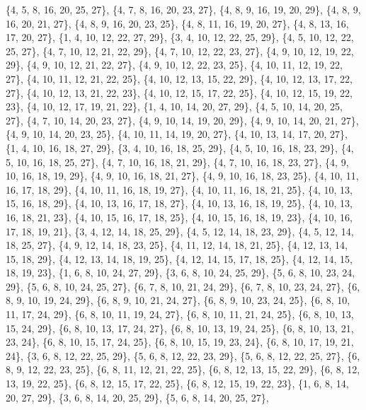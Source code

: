 \documentclass[11pt,a4paper]{article}
\begin{document}
{\{4, 5, 8, 16, 20, 25, 27\}, \{4, 7, 8, 16, 20, 23, 27\}, \{4, 8, 9, 16, 19, 20, 29\}, \{4, 8, 9, 16, 20, 21, 27\}, \{4, 8, 9, 16, 20, 23, 25\},
\{4, 8, 11, 16, 19, 20, 27\}, \{4, 8, 13, 16, 17, 20, 27\}, \{1, 4, 10, 12, 22, 27, 29\}, \{3, 4, 10, 12, 22, 25, 29\}, \{4, 5, 10, 12, 22, 25, 27\},
\{4, 7, 10, 12, 21, 22, 29\}, \{4, 7, 10, 12, 22, 23, 27\}, \{4, 9, 10, 12, 19, 22, 29\}, \{4, 9, 10, 12, 21, 22, 27\}, \{4, 9, 10, 12, 22, 23, 25\},
\{4, 10, 11, 12, 19, 22, 27\}, \{4, 10, 11, 12, 21, 22, 25\}, \{4, 10, 12, 13, 15, 22, 29\}, \{4, 10, 12, 13, 17, 22, 27\}, \{4, 10, 12, 13, 21, 22, 23\},
\{4, 10, 12, 15, 17, 22, 25\}, \{4, 10, 12, 15, 19, 22, 23\}, \{4, 10, 12, 17, 19, 21, 22\}, \{1, 4, 10, 14, 20, 27, 29\}, \{4, 5, 10, 14, 20, 25, 27\},
\{4, 7, 10, 14, 20, 23, 27\}, \{4, 9, 10, 14, 19, 20, 29\}, \{4, 9, 10, 14, 20, 21, 27\}, \{4, 9, 10, 14, 20, 23, 25\}, \{4, 10, 11, 14, 19, 20, 27\},
\{4, 10, 13, 14, 17, 20, 27\}, \{1, 4, 10, 16, 18, 27, 29\}, \{3, 4, 10, 16, 18, 25, 29\}, \{4, 5, 10, 16, 18, 23, 29\}, \{4, 5, 10, 16, 18, 25, 27\},
\{4, 7, 10, 16, 18, 21, 29\}, \{4, 7, 10, 16, 18, 23, 27\}, \{4, 9, 10, 16, 18, 19, 29\}, \{4, 9, 10, 16, 18, 21, 27\}, \{4, 9, 10, 16, 18, 23, 25\},
\{4, 10, 11, 16, 17, 18, 29\}, \{4, 10, 11, 16, 18, 19, 27\}, \{4, 10, 11, 16, 18, 21, 25\}, \{4, 10, 13, 15, 16, 18, 29\}, \{4, 10, 13, 16, 17, 18, 27\},
\{4, 10, 13, 16, 18, 19, 25\}, \{4, 10, 13, 16, 18, 21, 23\}, \{4, 10, 15, 16, 17, 18, 25\}, \{4, 10, 15, 16, 18, 19, 23\}, \{4, 10, 16, 17, 18, 19, 21\},
\{3, 4, 12, 14, 18, 25, 29\}, \{4, 5, 12, 14, 18, 23, 29\}, \{4, 5, 12, 14, 18, 25, 27\}, \{4, 9, 12, 14, 18, 23, 25\}, \{4, 11, 12, 14, 18, 21, 25\},
\{4, 12, 13, 14, 15, 18, 29\}, \{4, 12, 13, 14, 18, 19, 25\}, \{4, 12, 14, 15, 17, 18, 25\}, \{4, 12, 14, 15, 18, 19, 23\}, \{1, 6, 8, 10, 24, 27, 29\},
\{3, 6, 8, 10, 24, 25, 29\}, \{5, 6, 8, 10, 23, 24, 29\}, \{5, 6, 8, 10, 24, 25, 27\}, \{6, 7, 8, 10, 21, 24, 29\}, \{6, 7, 8, 10, 23, 24, 27\},
\{6, 8, 9, 10, 19, 24, 29\}, \{6, 8, 9, 10, 21, 24, 27\}, \{6, 8, 9, 10, 23, 24, 25\}, \{6, 8, 10, 11, 17, 24, 29\}, \{6, 8, 10, 11, 19, 24, 27\},
\{6, 8, 10, 11, 21, 24, 25\}, \{6, 8, 10, 13, 15, 24, 29\}, \{6, 8, 10, 13, 17, 24, 27\}, \{6, 8, 10, 13, 19, 24, 25\}, \{6, 8, 10, 13, 21, 23, 24\},
\{6, 8, 10, 15, 17, 24, 25\}, \{6, 8, 10, 15, 19, 23, 24\}, \{6, 8, 10, 17, 19, 21, 24\}, \{3, 6, 8, 12, 22, 25, 29\}, \{5, 6, 8, 12, 22, 23, 29\},
\{5, 6, 8, 12, 22, 25, 27\}, \{6, 8, 9, 12, 22, 23, 25\}, \{6, 8, 11, 12, 21, 22, 25\}, \{6, 8, 12, 13, 15, 22, 29\}, \{6, 8, 12, 13, 19, 22, 25\},
\{6, 8, 12, 15, 17, 22, 25\}, \{6, 8, 12, 15, 19, 22, 23\}, \{1, 6, 8, 14, 20, 27, 29\}, \{3, 6, 8, 14, 20, 25, 29\}, \{5, 6, 8, 14, 20, 25, 27\},
}
\end{document}
